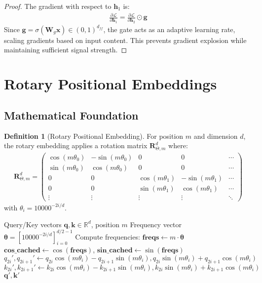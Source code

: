 \documentclass[12pt]{article}
\theoremstyle{definition}
\newtheorem{definition}{Definition}
\begin{document}
\begin{proof}
The gradient with respect to $\mathbf{h}_1$ is:
\begin{align}
\frac{\partial \mathcal{L}}{\partial \mathbf{h}_1} = \frac{\partial \mathcal{L}}{\partial \mathbf{h}_2} \odot \mathbf{g}
\end{align}
Since $\mathbf{g} = \sigma(\mathbf{W}_g \mathbf{x}) \in (0,1)^{d_{ff}}$, the gate acts as an adaptive learning rate, scaling gradients based on input content. This prevents gradient explosion while maintaining sufficient signal strength.
\end{proof}

\section{Rotary Positional Embeddings}

\subsection{Mathematical Foundation}

\begin{definition}[Rotary Positional Embedding]
For position $m$ and dimension $d$, the rotary embedding applies a rotation matrix $\mathbf{R}_{\Theta, m}^d$ where:
\begin{align}
\mathbf{R}_{\Theta, m}^d = \begin{pmatrix}
\cos(m\theta_0) & -\sin(m\theta_0) & 0 & 0 & \cdots \\
\sin(m\theta_0) & \cos(m\theta_0) & 0 & 0 & \cdots \\
0 & 0 & \cos(m\theta_1) & -\sin(m\theta_1) & \cdots \\
0 & 0 & \sin(m\theta_1) & \cos(m\theta_1) & \cdots \\
\vdots & \vdots & \vdots & \vdots & \ddots
\end{pmatrix}
\end{align}
with $\theta_i = 10000^{-2i/d}$.
\end{definition}

\begin{algorithm}[H]
\caption{Efficient Rotary Positional Embedding}
\label{alg:rope}
\begin{algorithmic}[1]
\REQUIRE Query/Key vectors $\mathbf{q}, \mathbf{k} \in \mathbb{R}^d$, position $m$
\REQUIRE Frequency vector $\boldsymbol{\theta} = [10000^{-2i/d}]_{i=0}^{d/2-1}$
\STATE Compute frequencies: $\mathbf{freqs} \leftarrow m \cdot \boldsymbol{\theta}$
\STATE $\mathbf{cos\_cached} \leftarrow \cos(\mathbf{freqs})$, $\mathbf{sin\_cached} \leftarrow \sin(\mathbf{freqs})$
    \STATE $q_{2i}', q_{2i+1}' \leftarrow q_{2i} \cos(m\theta_i) - q_{2i+1} \sin(m\theta_i), q_{2i} \sin(m\theta_i) + q_{2i+1} \cos(m\theta_i)$
    \STATE $k_{2i}', k_{2i+1}' \leftarrow k_{2i} \cos(m\theta_i) - k_{2i+1} \sin(m\theta_i), k_{2i} \sin(m\theta_i) + k_{2i+1} \cos(m\theta_i)$
\ENDFOR
\RETURN $\mathbf{q}', \mathbf{k}'$
\end{algorithmic}
\end{algorithm}
\end{document}
